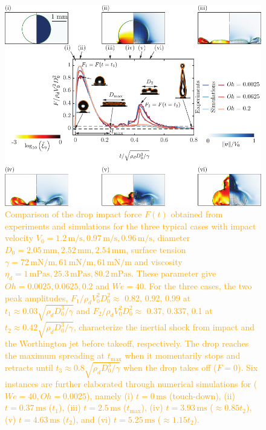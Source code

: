 \documentclass[]{article}
\newcommand{\VS}[1]{{\textcolor{orange}{#1}}}
\begin{document}
\begin{enumerate}
	 	\begin{figure}
	 	\centering
	 	\includegraphics[width=\textwidth]{../Main/Figures/Figure1_summary_v5.pdf}
	 	\caption{\VS{Comparison of the drop impact force $F(t)$ obtained from experiments and simulations for the three typical cases with impact velocity $V_0 = 1.2\,\si{\meter}/\si{\second}, 0.97\,\si{\meter}/\si{\second}, 0.96\,\si{\meter}/\si{\second}$, diameter $D_0 = 2.05\,\si{\milli\meter}, 2.52\,\si{\milli\meter}, 2.54\,\si{\milli\meter}$, surface tension $\gamma = 72\,\si{\milli\newton}/\si{\meter}, 61\,\si{\milli\newton}/\si{\meter}, 61\,\si{\milli\newton}/\si{\meter}$ and viscosity $\eta_d = 1\,\si{\milli\pascal\second}, 25.3\,\si{\milli\pascal\second}, 80.2\,\si{\milli\pascal\second}$. These parameter give $Oh = 0.0025, 0.0625, 0.2$ and $We = 40$.
		For the three cases, the two peak amplitudes, $F_1/\rho_dV_0^2D_0^2 \approx$ 0.82, 0.92, 0.99 at $t_1 \approx 0.03\sqrt{\rho_dD_0^3/\gamma}$ and $F_2/\rho_dV_0^2D_0^2 \approx$ 0.37, 0.337, 0.1 at $t_2 \approx 0.42\sqrt{\rho_dD_0^3/\gamma}$, characterize the inertial shock from impact and the Worthington jet before takeoff, respectively. 
		The drop reaches the maximum spreading at $t_{\text{max}}$ when it momentarily stops and retracts until $t_3 \approx 0.8\sqrt{\rho_dD_0^3/\gamma}$ when the drop takes off ($F = 0$).
		Six instances are further elaborated through numerical simulations for ($We = 40, Oh = 0.0025$), namely (i) $t = 0\,\si{\milli\second}$ (touch-down), (ii) $t = 0.37\,\si{\milli\second}$ ($t_1$), (iii) $t = 2.5\,\si{\milli\second}$ ($t_{\text{max}}$), (iv) $t = 3.93\,\si{\milli\second}$ ($\approx 0.85t_2$), (v) $t = 4.63\,\si{\milli\second}$ ($t_2$), and (vi) $t = 5.25\,\si{\milli\second}$ ($\approx 1.15t_2$). 
}}
\end{figure}
\end{enumerate}
\end{document}
